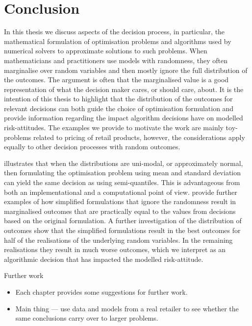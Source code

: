 \documentclass[main.tex]{subfiles}
\begin{document}
\chapter{Conclusion}

In this thesis we discuss aspects of the decision process, in
particular, the mathematical formulation of optimisation problems and
algorithms used by numerical solvers to approximate
solutions to such problems.
When mathematicians and practitioners use models with randomness, they
often marginalise over random variables and then mostly ignore the
full distribution of the outcomes. The argument is often that the
marginalised value is a good representation of what the decision maker
cares, or should care, about.
It is the intention of this thesis to highlight that the distribution
of the outcomes for relevant decisions can both guide the choice of
optimisation formulation and provide information regarding the impact
algorithm decisions have on modelled risk-attitudes.
The examples we provide to motivate the work are mainly toy-problems
related to pricing of retail products, however, the considerations
apply equally to other decision processes with random outcomes.

 illustrates that when the distributions are
uni-modal, or approximately normal, then formulating the optimisation
problem using mean and standard deviation can yield the same decision
as using semi-quantiles. This is advantageous from both an
implementational and a computational point of view.
 provide further examples of
how simplified formulations that ignore the randomness result in
marginalised outcomes that are practically equal to the values from
decisions based on the original formulation. A further investigation
of the distribution of outcomes show that the simplified formulations
result in the best outcomes for half of the realisations of the
underlying random variables. In the remaining realisations they result
in much worse outcomes, which we interpret as an algorithmic decision
that has impacted the modelled risk-attitude.




Further work
\begin{itemize}
\item Each chapter provides some suggestions for further work.
\item Main thing --- use data and models from a real retailer to see
  whether the same conclusions carry over to larger problems.
\end{itemize}

\biblio{} %
\end{document}
